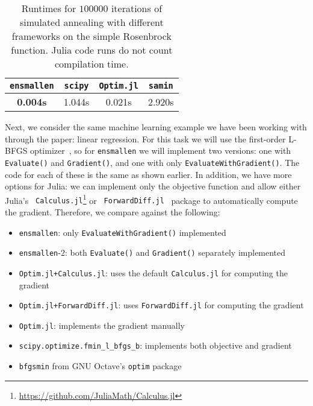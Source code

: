 \documentclass{article}
\begin{document}
\begin{table}[t]
\begin{center}
\begin{tabular}{cccc}
\toprule
{\tt ensmallen} & {\tt scipy} & {\tt Optim.jl} & {\tt samin} \\
\midrule
{\bf 0.004s} & 1.044s & 0.021s & 2.920s \\
\bottomrule
\end{tabular}
\end{center}
\caption{Runtimes for $100000$ iterations of simulated annealing with different
frameworks on the simple Rosenbrock function.  Julia code runs do not count
compilation time.}
\label{tab:rosenbrock_results}
\end{table}

Next, we consider the same machine learning example we have been working with
through the paper: linear regression.  For this task we will use the first-order
L-BFGS optimizer~\cite{zhu1997algorithm},
so for {\tt ensmallen} we will implement two versions: one with {\tt Evaluate()}
and {\tt Gradient()}, and one with only {\tt EvaluateWithGradient()}.  The code
for each of these is the same as shown earlier.  In addition, we have more
options for Julia: we can implement only the objective function and allow either
Julia's {\tt
Calculus.jl}\footnote{\url{https://github.com/JuliaMath/Calculus.jl}} or {\tt
ForwardDiff.jl}~\cite{RevelsLubinPapamarkou2016} package to automatically
compute the gradient.  Therefore, we compare against the following:

\begin{itemize}
  \item {\tt ensmallen}: only {\tt EvaluateWithGradient()} implemented
  \item {\tt ensmallen}-2: both {\tt Evaluate()} and {\tt Gradient()} separately
implemented
  \item {\tt Optim.jl+Calculus.jl}: uses the default {\tt Calculus.jl} for
computing the gradient
  \item {\tt Optim.jl+ForwardDiff.jl}: uses {\tt ForwardDiff.jl} for computing
the gradient
  \item {\tt Optim.jl}: implements the gradient manually
  \item {\tt scipy.optimize.fmin\_l\_bfgs\_b}: implements both objective and
gradient
  \item {\tt bfgsmin} from GNU Octave's {\tt optim} package
\end{itemize}
\end{document}
